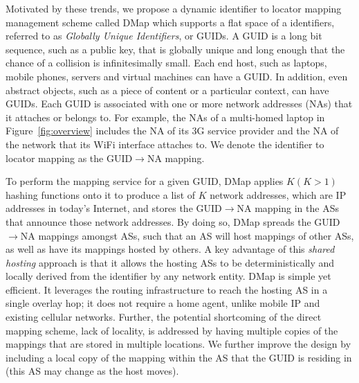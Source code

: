 Motivated by these trends, we propose a dynamic identifier to locator mapping management scheme called DMap which supports a flat space of a identifiers, referred to as {\em Globally Unique Identifiers}, or GUIDs. A GUID is a long bit sequence, such as a public key, that is globally unique and long enough that the chance of a collision is infinitesimally small. Each end host, such as laptops, mobile phones, servers and virtual machines can have a GUID. In addition, even abstract objects, such as a piece of content or a particular context, can have GUIDs. Each GUID is associated with one or more network addresses (NAs) that it attaches or belongs to. For example, the NAs of a multi-homed laptop in Figure~\ref{fig:overview} includes the NA of its 3G service provider and the NA of the network that its WiFi interface attaches to. We denote the identifier to locator mapping as the GUID$\rightarrow$NA mapping.

To perform the mapping service for a given GUID, DMap applies $K (K>1)$ hashing functions onto it to produce a list of $K$ network addresses, which are IP addresses in today's Internet, and stores the GUID$\rightarrow$NA mapping in the ASs that announce those network addresses. By doing so, DMap spreads the GUID$\rightarrow$NA mappings amongst ASs, such that an AS will host mappings of other ASs, as well as have its mappings hosted by others. A key advantage of this {\em shared hosting} approach is that it allows the hosting ASs to be deterministically and locally derived from the identifier by any network entity. DMap is simple yet efficient. It leverages the routing infrastructure to reach the hosting AS in a single overlay hop; it does not require a home agent, unlike mobile IP and existing cellular networks. Further, the potential shortcoming of the direct mapping scheme, lack of locality, is addressed by having multiple copies of the mappings that are stored in multiple locations. We further improve the design by including a local copy of the mapping within the AS that the GUID is residing in (this AS may change as the host moves).


